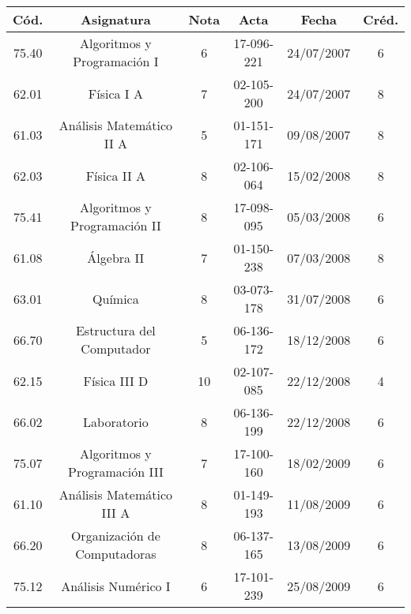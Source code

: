     \small{
        \begin{center}
        \hspace*{-1cm}
        \begin{tabular}{|c|c|c|c|c|c|}
            \hline
            \textbf{Cód.} & \textbf{Asignatura} & \textbf{Nota} & \textbf{Acta} & \textbf{Fecha} & \textbf{Créd.} \\ 
            \hline
            75.40 & Algoritmos y Programación I                 &  6   &  17-096-221  &  24/07/2007  & 6  \\
            \hline
            62.01 & Física I A                                  &  7   &  02-105-200  &  24/07/2007  & 8  \\
            \hline
            61.03 & Análisis Matemático II A                    &  5   &  01-151-171  &  09/08/2007  & 8  \\
            \hline
            62.03 & Física II A                                 &  8   &  02-106-064  &  15/02/2008  & 8  \\
            \hline
            75.41 & Algoritmos y Programación II                &  8   &  17-098-095  &  05/03/2008  & 6  \\
            \hline
            61.08 & Álgebra II                                  &  7   &  01-150-238  &  07/03/2008  & 8  \\
            \hline
            63.01 & Química                                     &  8   &  03-073-178  &  31/07/2008  & 6  \\
            \hline
            66.70 & Estructura del Computador                   &  5   &  06-136-172  &  18/12/2008  & 6  \\
            \hline
            62.15 & Física III D                                &  10  &  02-107-085  &  22/12/2008  & 4  \\
            \hline
            66.02 & Laboratorio                                 &  8   &  06-136-199  &  22/12/2008  & 6  \\
            \hline
            75.07 & Algoritmos y Programación III               &  7   &  17-100-160  &  18/02/2009  & 6  \\
            \hline
            61.10 & Análisis Matemático III A                   &  8   &  01-149-193  &  11/08/2009  & 6  \\
            \hline
            66.20 & Organización de Computadoras                &  8   &  06-137-165  &  13/08/2009  & 6  \\
            \hline
            75.12 & Análisis Numérico I                         &  6   &  17-101-239  &  25/08/2009  & 6  \\

\end{tabular}
\end{center}}
